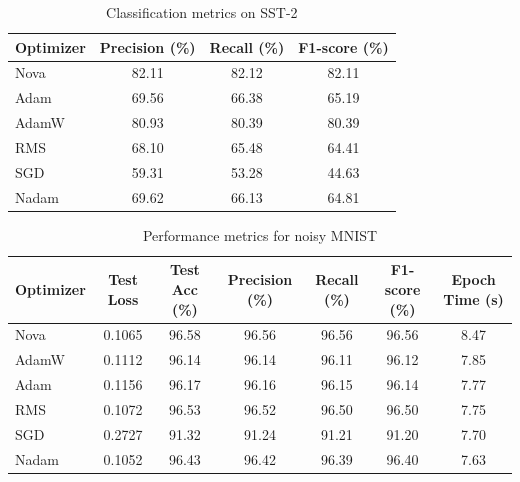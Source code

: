 \documentclass{article}
\begin{document}
 \begin{table}[H]
\centering
\caption{Classification metrics on SST-2}
\begin{tabular}{lccc}
\toprule
Optimizer & Precision (\%) & Recall (\%) & F1-score (\%) \\
\midrule
Nova & 82.11 & 82.12 & 82.11  \\
Adam & 69.56 & 66.38 & 65.19  \\
AdamW & 80.93 & 80.39 & 80.39  \\
RMS & 68.10 & 65.48 & 64.41 \\
SGD & 59.31 & 53.28 & 44.63  \\
Nadam & 69.62 & 66.13 & 64.81  \\
\bottomrule
\end{tabular}
\label{tab:sst-2_prf}
\end{table}












\begin{table}[H]
\centering
\caption{Performance metrics for noisy MNIST}
\begin{tabular}{lcccccc}\toprule
Optimizer & Test Loss & Test Acc (\%) & Precision (\%) & Recall (\%) & F1-score (\%) & Epoch Time (s) \\ \midrule
Nova & 0.1065 & 96.58 & 96.56 & 96.56 & 96.56 & 8.47 \\
AdamW & 0.1112 & 96.14 & 96.14 & 96.11 & 96.12 & 7.85 \\
Adam & 0.1156 & 96.17 & 96.16 & 96.15 & 96.14 & 7.77 \\
RMS & 0.1072 & 96.53 & 96.52 & 96.50 & 96.50 & 7.75 \\
SGD & 0.2727 & 91.32 & 91.24 & 91.21 & 91.20 & 7.70 \\
Nadam & 0.1052 & 96.43 & 96.42 & 96.39 & 96.40 & 7.63 \\
\bottomrule
\end{tabular}
\label{tab:mnist_noisy_main}
\end{table}
\end{document}
